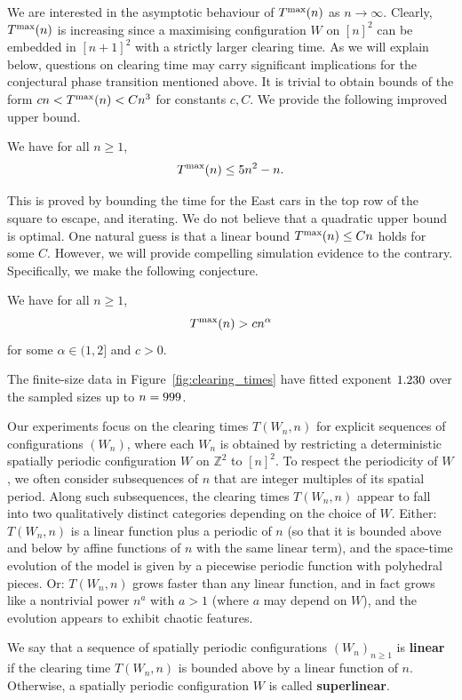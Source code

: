 \documentclass[reqno]{amsart}
\begin{document}
We are interested in the asymptotic behaviour of $T^{\text{\rm max}}(n)$ as $n\to\infty$. Clearly, $T^{\text{\rm max}}(n)$ is increasing since a maximising configuration $W$ on $[n]^2$ can be embedded in $[n+1]^2$ with a strictly larger clearing time.   As we will explain below, questions on clearing time may carry significant implications for the conjectural phase transition mentioned above. It is trivial to obtain bounds of the form $cn <T^{\text{\rm max}}(n) < C n^3$ for constants $c,C$. We provide the following improved upper bound.
\begin{theorem} \label{thm:upper_bound} We have for all $n\geq 1$,
\[ T^{\text{\rm max}}(n) \leq 5 n^2-n. \]
\end{theorem}
This is proved by bounding the time for the East cars in the top row of the square to escape, and iterating.  We do not believe that a quadratic upper bound is optimal. One natural guess is that a linear bound $T^{\text{\rm max}}(n) \leq C n$ holds for some $C$.  However, we will provide compelling simulation evidence to the contrary.  Specifically, we make the following conjecture.
\begin{conjecture} We have for all $n\geq 1$,
	\[ T^{\text{\rm max}}(n) > c n^\alpha \]
	for some $\alpha \in (1,2]$ and $c > 0$.
\end{conjecture}
The finite-size data in Figure~\ref{fig:clearing_times} have fitted exponent $1.230$ over the sampled sizes up to $n=999$.

Our experiments focus on the clearing times $ T(W_n, n) $ for explicit sequences of configurations $ (W_n) $, where each $ W_n $ is obtained by restricting a deterministic spatially periodic configuration $ W $ on $ \mathbb{Z}^2 $ to $ [n]^2 $. To respect the periodicity of $ W $, we often consider subsequences of $ n $ that are integer multiples of its spatial period. Along such subsequences, the clearing times $ T(W_n, n) $ appear to fall into two qualitatively distinct categories depending on the choice of $ W $. Either: $ T(W_n, n) $ is a linear function plus a periodic of $n$ (so that it is bounded above and below by affine functions of $ n $ with the same linear term), and the space-time evolution of the model is given by a piecewise periodic function with polyhedral pieces. Or: $ T(W_n, n) $ grows faster than any linear function, and in fact grows like a nontrivial power $ n^a $ with $a>1$ (where $a$ may depend on $W$), and the evolution appears to exhibit chaotic features.

We say that a sequence of spatially periodic configurations $ (W_n)_{n\geq 1} $ is \textbf{linear} if the clearing time $ T(W_n, n) $ is bounded above by a linear function of $ n $.  Otherwise, a spatially periodic configuration $ W $ is called \textbf{superlinear}.
\end{document}

